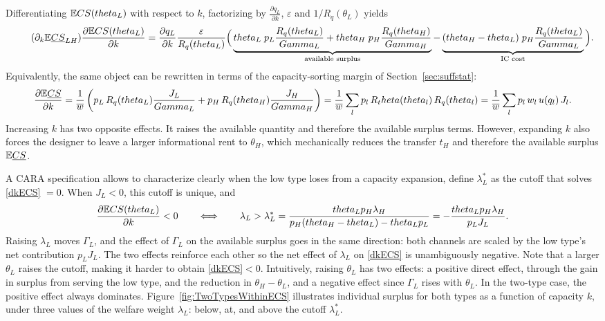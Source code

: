 \documentclass{class}
\begin{document}
Differentiating $\mathbb{E} CS(theta_L)$ with respect to $k$, factorizing by $\frac{\partial q_L}{\partial k}$, $\varepsilon$ and $1/R_q(\theta_L)$ yields
\[
\tag{$\partial_k \E \underline{CS}_{LH}$}\label{dkECS} \frac{\partial  \E CS(\theta_L)}{\partial k} = \frac{\partial q_L}{\partial k} \frac{\varepsilon }{R_q(\theta_L)} \Big( \underbrace{\theta_L \; p_L \frac{R_q(\theta_L)}{\Gamma_L} + \theta_H \; p_H \frac{R_q(\theta_H)}{\Gamma_H}}_{\text{available surplus}} - \underbrace{(\theta_H - \theta_L) \; p_H \frac{R_q(\theta_L)}{\Gamma_L}}_{\text{IC cost}} \Big).
\] 
Equivalently, the same object can be rewritten in terms of the capacity-sorting margin of Section~\ref{sec:suffstat}: 
\[
\frac{\partial \mathbb{E}\underline{CS}}{\partial k} = \frac{1}{\overline{w}}\left(p_L\,R_q(theta_L)\frac{J_L}{Gamma_L} + p_H\,R_q(theta_H)\frac{J_H}{Gamma_H}\right) = \frac{1}{\overline{w}}\sum_l p_l\,R_theta(theta_l)\,R_q(theta_l) = \frac{1}{\overline{w}}\sum_l p_l\,w_l\,u(q_l)\,J_l.
\]
Increasing $k$ has two opposite effects. It raises the available quantity and therefore the available surplus terms. However, expanding $k$ also forces the designer to leave a larger informational rent to $\theta_H$, which mechanically reduces the transfer $t_H$ and therefore the available surplus $\mathbb{E} \underline{CS}$.

A CARA specification allows to characterize clearly when the low type loses from a capacity expansion, define $\lambda_L^\ast$ as the cutoff that solves \ref{dkECS} $=  0$. When $J_L < 0$, this cutoff is unique, and
\[
\frac{\partial  \mathbb{E} CS(theta_L)}{\partial k} < 0
\qquad \Longleftrightarrow \qquad
\lambda_L > \lambda_L^\ast = \frac{theta_L p_H \lambda_H}{p_H(theta_H - theta_L) - theta_L p_L} = -\frac{theta_L p_H \lambda_H}{p_LJ_L}.
\]
Raising $\lambda_L$ moves $\Gamma_L$, and the effect of $\Gamma_L$ on the available surplus goes in the same direction: both channels are scaled by the low type's net contribution $p_L J_L$. The two effects reinforce each other so the net effect of $\lambda_L$ on \ref{dkECS} is unambiguously negative. Note that a larger $\theta_L$ raises the cutoff, making it harder to obtain \ref{dkECS}$< 0$. Intuitively, raising $\theta_L$ has two effects: a positive direct effect, through the gain in surplus from serving the low type, and the reduction in $\theta_H - \theta_L$, and a negative effect since $\Gamma_L$ rises with $\theta_L$. In the two-type case, the positive effect always dominates. Figure~\ref{fig:TwoTypesWithinECS} illustrates individual surplus for both types as a function of capacity $k$, under three values of the welfare weight $\lambda_L$: below, at, and above the cutoff $\lambda_L^\ast$.
\end{document}
